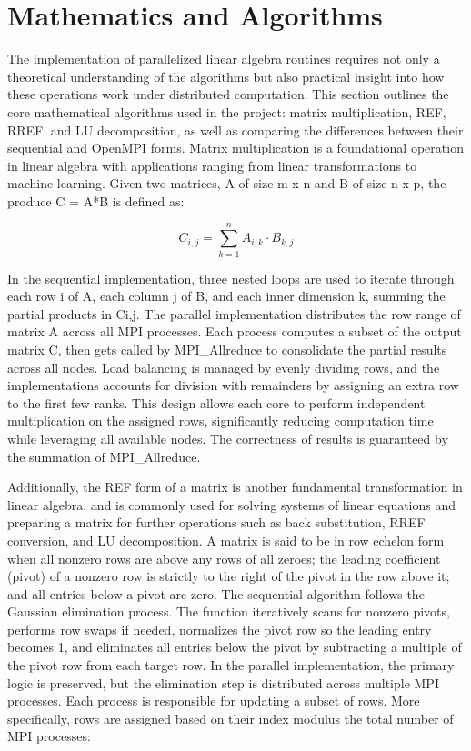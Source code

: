 \documentclass[12pt]{article}
\begin{document}
\section{Mathematics and Algorithms}
The implementation of parallelized linear algebra routines requires not only a theoretical understanding of the algorithms but also practical insight into how these operations work under distributed computation. This section outlines the core mathematical algorithms used in the project: matrix multiplication, REF, RREF, and LU decomposition, as well as comparing the differences between their sequential and OpenMPI forms.
Matrix multiplication is a foundational operation in linear algebra with applications ranging from linear transformations to machine learning. Given two matrices, A of size m x n and B of size n x p, the produce C = A*B is defined as:

\[
    C_{i,j} = \sum_{k=1}^{n} A_{i,k} \cdot B_{k,j}
\]

In the sequential implementation, three nested loops are used to iterate through each row i of A, each column j of B, and each inner dimension k, summing the partial products in Ci,j. The parallel implementation distributes the row range of matrix A across all MPI processes. Each process computes a subset of the output matrix C, then gets called by MPI\_Allreduce to consolidate the partial results across all nodes. Load balancing is managed by evenly dividing rows, and the implementations accounts for division with remainders by assigning an extra row to the first few ranks. This design allows each core to perform independent multiplication on the assigned rows, significantly reducing computation time while leveraging all available nodes. The correctness of results is guaranteed by the summation of MPI\_Allreduce.

Additionally, the REF form of a matrix is another fundamental transformation in linear algebra, and is commonly used for solving systems of linear equations and preparing a matrix for further operations such as back substitution, RREF conversion, and LU decomposition. A matrix is said to be in row echelon form when all nonzero rows are above any rows of all zeroes; the leading coefficient (pivot) of a nonzero row is strictly to the right of the pivot in the row above it; and all entries below a pivot are zero. The sequential algorithm follows the Gaussian elimination process. The function iteratively scans for nonzero pivots, performs row swaps if needed, normalizes the pivot row so the leading entry becomes 1, and eliminates all entries below the pivot by subtracting a multiple of the pivot row from each target row. In the parallel implementation, the primary logic is preserved, but the elimination step is distributed across multiple MPI processes. Each process is responsible for updating a subset of rows. More specifically, rows are assigned based on their index modulus the total number of MPI processes:
\end{document}
